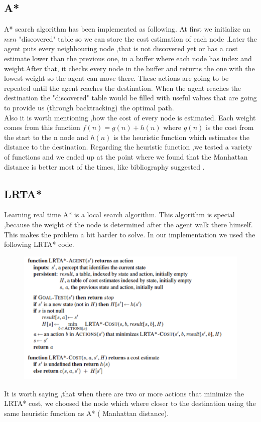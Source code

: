 \documentclass{article}
\begin{document}
\subsection{A*}
    A* search algorithm has been implemented as following. At first we initialize an $nxn$ "discovered" table so we can store the cost estimation of each node .Later the agent puts every neighbouring node ,that is not discovered yet or has a cost estimate lower than the previous one, in a buffer where each node has index and weight.After that, it checks every node in the buffer and returns the one with the lowest weight so the agent can move there. These actions are going to be repeated until the agent reaches the destination. When the agent reaches the destination the "discovered" table would be filled with useful values that are going to provide us (through backtracking) the optimal path. \\
    Also it is worth mentioning ,how the cost of every node is estimated. Each weight comes from this function $f(n) = g(n) + h(n)$ where $g(n)$ is the cost from the start to the n node and $h(n)$ is the heuristic function which estimates the distance to the destination. Regarding the heuristic function ,we tested a variety of functions and we ended up at the point where we found that the Manhattan distance is better most of the times, like bibliography suggested .
\subsection{LRTA*}
    Learning real time A* is a local search algorithm. This algorithm is special ,because the weight of the node is determined after the agent walk there himself. This makes the problem a bit harder to solve. In our implementation we used the following LRTA* code.


\begin{figure}[h!]
\centering
\includegraphics[scale=0.5]{lrta.png}
\end{figure}
    It is worth saying ,that when there are two or more actions that minimize the LRTA* cost, we choosed the node which where closer to the destination using the same heuristic function as A* ( Manhattan distance).
    
\end{document}
